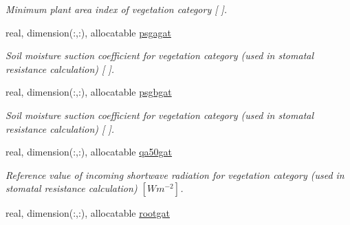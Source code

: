 \begin{DoxyCompactItemize}
\begin{DoxyCompactList}\small\item\em Minimum plant area index of vegetation category \mbox{[} \mbox{]}. \end{DoxyCompactList}\item 
\hypertarget{structclass__statevars_1_1class__gather_a2d0bd1077d6fdadc56ab26e1eec80f39}{}real, dimension(\+:,\+:), allocatable \hyperlink{structclass__statevars_1_1class__gather_a2d0bd1077d6fdadc56ab26e1eec80f39}{psgagat}\label{structclass__statevars_1_1class__gather_a2d0bd1077d6fdadc56ab26e1eec80f39}

\begin{DoxyCompactList}\small\item\em Soil moisture suction coefficient for vegetation category (used in stomatal resistance calculation) \mbox{[} \mbox{]}. \end{DoxyCompactList}\item 
\hypertarget{structclass__statevars_1_1class__gather_abfabad8a74bdad718da4353bb7a7ae6d}{}real, dimension(\+:,\+:), allocatable \hyperlink{structclass__statevars_1_1class__gather_abfabad8a74bdad718da4353bb7a7ae6d}{psgbgat}\label{structclass__statevars_1_1class__gather_abfabad8a74bdad718da4353bb7a7ae6d}

\begin{DoxyCompactList}\small\item\em Soil moisture suction coefficient for vegetation category (used in stomatal resistance calculation) \mbox{[} \mbox{]}. \end{DoxyCompactList}\item 
\hypertarget{structclass__statevars_1_1class__gather_a9571764baea9fe88ab96276197785a0d}{}real, dimension(\+:,\+:), allocatable \hyperlink{structclass__statevars_1_1class__gather_a9571764baea9fe88ab96276197785a0d}{qa50gat}\label{structclass__statevars_1_1class__gather_a9571764baea9fe88ab96276197785a0d}

\begin{DoxyCompactList}\small\item\em Reference value of incoming shortwave radiation for vegetation category (used in stomatal resistance calculation) $[W m^{-2} ]$. \end{DoxyCompactList}\item 
\hypertarget{structclass__statevars_1_1class__gather_ae55ca015675206efa3b94dd711f00b44}{}real, dimension(\+:,\+:), allocatable \hyperlink{structclass__statevars_1_1class__gather_ae55ca015675206efa3b94dd711f00b44}{rootgat}\label{structclass__statevars_1_1class__gather_ae55ca015675206efa3b94dd711f00b44}


\end{DoxyCompactItemize}
